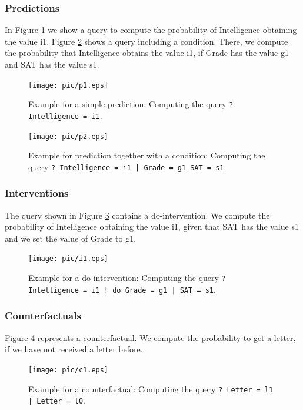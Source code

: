 \subsubsection{Predictions}
In Figure \ref{figure:p1} we show a query to compute the probability of Intelligence obtaining the value i1. Figure \ref{figure:p2} shows a query including a condition.
There, we compute the probability that Intelligence obtains the value i1, if Grade has the value g1 and SAT has the value s1.
\begin{figure}[H]
 \begin{center}
  \texttt{[image: pic/p1.eps]}
  \caption{Example for a simple prediction: Computing the query \texttt{? Intelligence = i1}.}
  \label{figure:p1}
 \end{center}
\end{figure}
\begin{figure}[H]
 \begin{center}
  \texttt{[image: pic/p2.eps]}
  \caption{Example for prediction together with a condition: Computing the query \texttt{? Intelligence = i1 | Grade = g1 SAT = s1}.}
  \label{figure:p2}
 \end{center}
\end{figure}

\subsubsection{Interventions}
The query shown in Figure \ref{figure:i1} contains a do-intervention. We compute the probability of Intelligence obtaining the value i1, given that SAT has the value s1 and we set the value of Grade to g1.
\begin{figure}[H]
 \begin{center}
  \texttt{[image: pic/i1.eps]}
  \caption{Example for a do intervention: Computing the query \texttt{? Intelligence = i1 ! do Grade = g1 | SAT = s1}.}
  \label{figure:i1}
 \end{center}
\end{figure}

\subsubsection{Counterfactuals}
Figure \ref{figure:c} represents a counterfactual. We compute the probability to get a letter, if we  have not received a letter before.
\begin{figure}[H]
 \begin{center}
  \texttt{[image: pic/c1.eps]}
  \caption{Example for a counterfactual: Computing the query \texttt{? Letter = l1 | Letter = l0}.}
  \label{figure:c}
 \end{center}
\end{figure}
